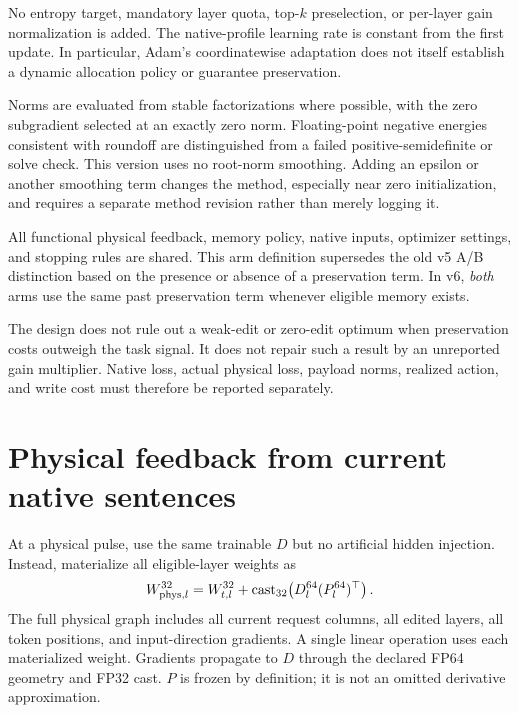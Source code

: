 \documentclass[10pt]{article}
\begin{document}
No entropy target, mandatory layer quota, top-$k$ preselection, or
per-layer gain normalization is added. The native-profile learning rate
is constant from the first update. In particular, Adam's
coordinatewise adaptation does not itself establish a dynamic allocation
policy or guarantee preservation.

Norms are evaluated from stable factorizations where possible, with
the zero subgradient selected at an exactly zero norm. Floating-point
negative energies consistent with roundoff are distinguished from a
failed positive-semidefinite or solve check. This version uses no root-norm smoothing. Adding an epsilon or another
smoothing term changes the method, especially near zero initialization,
and requires a separate method revision rather than merely logging it.

All functional physical feedback, memory policy, native inputs, optimizer
settings, and stopping rules are shared. This arm definition supersedes
the old v5 A/B distinction based on the presence or absence of a
preservation term. In v6, \emph{both} arms use the same past preservation
term whenever eligible memory exists.

The design does not rule out a weak-edit or zero-edit optimum when
preservation costs outweigh the task signal. It does not repair such a
result by an unreported gain multiplier. Native loss, actual physical
loss, payload norms, realized action, and write cost must therefore be
reported separately.

\newpage
\section{Physical feedback from current native sentences}
At a physical pulse, use the same trainable $D$ but no artificial hidden
injection. Instead, materialize all eligible-layer weights as
\[
 W_{{\rm phys},l}^{32}
 =W_{t,l}^{32}+\operatorname{cast}_{32}\!
   \left(D_l^{64}(P_l^{64})^\top\right).
 \label{eq:physical}
\]
The full physical graph includes all current request columns, all edited
layers, all token positions, and input-direction gradients. A single
linear operation uses each materialized weight. Gradients propagate to
$D$ through the declared FP64 geometry and FP32 cast. $P$ is frozen by
definition; it is not an omitted derivative approximation.
\end{document}
